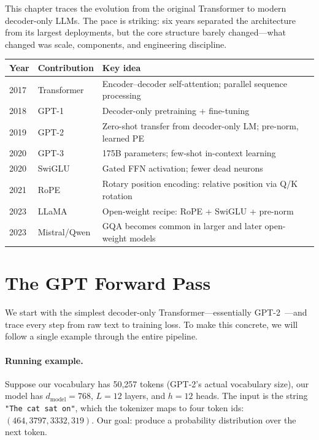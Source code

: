 This chapter traces the evolution from the original Transformer to modern decoder-only LLMs. The pace is striking: six years separated the architecture from its largest deployments, but the core structure barely changed---what changed was scale, components, and engineering discipline.

\begin{center}
\begin{tabularx}{\textwidth}{@{}lp{3.8cm}X@{}}
\toprule
Year & Contribution & Key idea \\
\midrule
2017 & Transformer & Encoder--decoder self-attention; parallel sequence processing \\
2018 & GPT-1 & Decoder-only pretraining + fine-tuning \\
2019 & GPT-2 & Zero-shot transfer from decoder-only LM; pre-norm, learned PE \\
2020 & GPT-3 & 175B parameters; few-shot in-context learning \\
2020 & SwiGLU & Gated FFN activation; fewer dead neurons \\
2021 & RoPE & Rotary position encoding: relative position via Q/K rotation \\
2023 & LLaMA & Open-weight recipe: RoPE + SwiGLU + pre-norm \\
2023 & Mistral/Qwen & GQA becomes common in larger and later open-weight models \\
\bottomrule
\end{tabularx}
\end{center}


\section{The GPT Forward Pass}
\label{sec:gpt-forward}

We start with the simplest decoder-only Transformer---essentially GPT-2~\cite{radford2019language}---and trace every step from raw text to training loss. To make this concrete, we will follow a single example through the entire pipeline.

\paragraph{Running example.} Suppose our vocabulary has 50{,}257 tokens (GPT-2's actual vocabulary size), our model has $d_\text{model} = 768$, $L = 12$ layers, and $h = 12$ heads. The input is the string \texttt{"The cat sat on"}, which the tokenizer maps to four token ids: $(464, 3797, 3332, 319)$. Our goal: produce a probability distribution over the next token.

